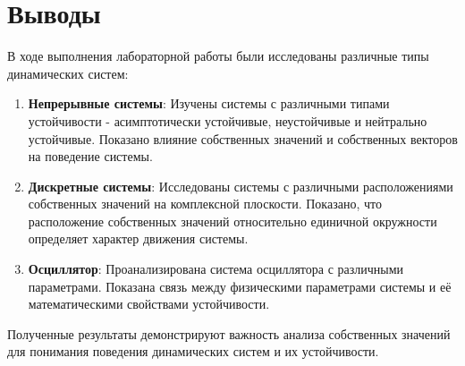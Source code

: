 \section{Выводы}

В ходе выполнения лабораторной работы были исследованы различные типы динамических систем:

\begin{enumerate}
\item \textbf{Непрерывные системы}: Изучены системы с различными типами устойчивости - асимптотически устойчивые, неустойчивые и нейтрально устойчивые. Показано влияние собственных значений и собственных векторов на поведение системы.

\item \textbf{Дискретные системы}: Исследованы системы с различными расположениями собственных значений на комплексной плоскости. Показано, что расположение собственных значений относительно единичной окружности определяет характер движения системы.

\item \textbf{Осциллятор}: Проанализирована система осциллятора с различными параметрами. Показана связь между физическими параметрами системы и её математическими свойствами устойчивости.
\end{enumerate}

Полученные результаты демонстрируют важность анализа собственных значений для понимания поведения динамических систем и их устойчивости.
